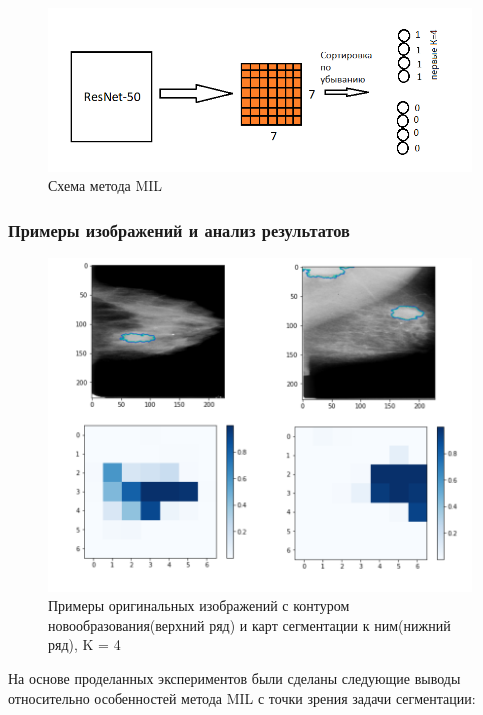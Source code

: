 \begin{figure}[h] 
  \center
  \includegraphics [scale=0.8] {images/schema_mil.png}
  \caption{Схема метода MIL} 
  \label{fig:schema_mil}  
\end{figure}

\subsubsection{Примеры изображений и анализ результатов}


\begin{figure}[h] 
  \center
  \includegraphics [scale=0.6] {images/mil.png}
  \caption{Примеры оригинальных изображений с контуром новообразования(верхний ряд) и карт сегментации к ним(нижний ряд), K = 4} 
  \label{fig:example_mil}  
\end{figure}


На основе проделанных экспериментов были сделаны следующие выводы относительно особенностей метода MIL с точки зрения задачи сегментации:

